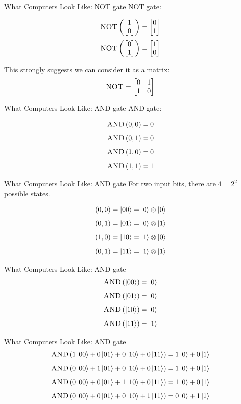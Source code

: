 \documentclass{beamer}
\begin{document}
\begin{frame}{What Computers Look Like: NOT gate}
    \textsc{NOT} gate:
    
    $$ \textsc{NOT}\left(\begin{bmatrix}
        1 \\
        0
    \end{bmatrix}\right) = \begin{bmatrix}
        0 \\
        1
    \end{bmatrix}$$
    $$ \textsc{NOT}\left(\begin{bmatrix}
        0 \\
        1
    \end{bmatrix}\right) = \begin{bmatrix}
        1 \\
        0
    \end{bmatrix}$$
    
    This strongly suggests we can consider it as a matrix: $$\textsc{NOT} = \begin{bmatrix}
        0 & 1 \\
        1 & 0 \\
    \end{bmatrix}$$
\end{frame}
\begin{frame}{What Computers Look Like: AND gate}
    \textsc{AND} gate:
    
    $$ \textsc{AND}\left(0, 0\right) = 0$$
    $$ \textsc{AND}\left(0, 1\right) = 0$$
    $$ \textsc{AND}\left(1, 0\right) = 0$$
    $$ \textsc{AND}\left(1, 1\right) = 1$$
\end{frame}
\begin{frame}{What Computers Look Like: AND gate}
    For two input bits, there are $4 = 2^2$ possible states. 
    
    $$ (0, 0) = \ket{00} = \ket{0} \otimes \ket{0}$$
    $$ (0, 1) = \ket{01} = \ket{0} \otimes \ket{1}$$
    $$ (1, 0) = \ket{10} = \ket{1} \otimes \ket{0}$$
    $$ (0, 1) = \ket{11} = \ket{1} \otimes \ket{1}$$
\end{frame}
\begin{frame}{What Computers Look Like: AND gate}
    $$ \textsc{AND}\left(\ket{00}\right) = \ket{0}$$
    $$ \textsc{AND}\left(\ket{01}\right) = \ket{0}$$
    $$ \textsc{AND}\left(\ket{10}\right) = \ket{0}$$
    $$ \textsc{AND}\left(\ket{11}\right) = \ket{1}$$
\end{frame}
\begin{frame}{What Computers Look Like: AND gate}
    $$ \textsc{AND}\left(1\ket{00}+0\ket{01}+0\ket{10}+0\ket{11}\right) = 1\ket{0}+0\ket{1}$$
    $$ \textsc{AND}\left(0\ket{00}+1\ket{01}+0\ket{10}+0\ket{11}\right) = 1\ket{0}+0\ket{1}$$
    $$ \textsc{AND}\left(0\ket{00}+0\ket{01}+1\ket{10}+0\ket{11}\right) = 1\ket{0}+0\ket{1}$$
    $$ \textsc{AND}\left(0\ket{00}+0\ket{01}+0\ket{10}+1\ket{11}\right) = 0\ket{0}+1\ket{1}$$
\end{frame}
\end{document}
